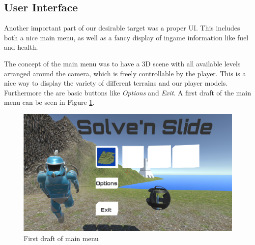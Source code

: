 \documentclass[12pt, letterpaper]{scrartcl}
\begin{document}
	\subsection{User Interface}
	Another important part of our desirable target was a proper UI. This includes both a nice main menu, as well as a fancy display of ingame information like fuel and health.
	
	 The concept of the main menu was to have a 3D scene with all available levels arranged around the camera, which is freely controllable by the player. This is a nice way to display the variety of different terrains and our player models. Furthermore the are basic buttons like \textit{Options} and \textit{Exit}. A first draft of the main menu can be seen in Figure \ref{fig:mainMenu}.
	 \begin{figure}[H]
	 	\centering
	 	\includegraphics[scale=.17]{images//alpha/mainMenu}
	 	\caption{First draft of main menu}
	 	\label{fig:mainMenu}
	 \end{figure}
	 
\end{document}
